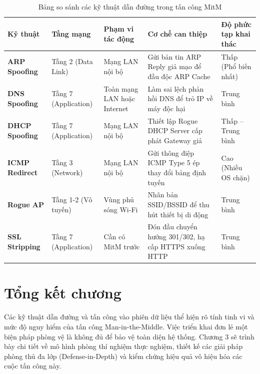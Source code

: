 \begin{table}[htbp]
  \centering
  \caption{Bảng so sánh các kỹ thuật dẫn đường trong tấn công MitM}
  \label{tab:redirection-comparison}
  \begin{tabularx}{\textwidth}{p{3.2cm} p{1.8cm} p{2.2cm} L p{2.5cm}}
    \toprule
    \textbf{Kỹ thuật} & \textbf{Tầng mạng} & \textbf{Phạm vi tác động} & \textbf{Cơ chế can thiệp} & \textbf{Độ phức tạp khai thác} \\
    \midrule
    \textbf{ARP Spoofing} & Tầng 2 (Data Link) & Mạng LAN nội bộ & Gửi bản tin ARP Reply giả mạo để đầu độc ARP Cache & Thấp (Phổ biến nhất) \\
    \textbf{DNS Spoofing} & Tầng 7 (Application) & Toàn mạng LAN hoặc Internet & Làm sai lệch phản hồi DNS để trỏ IP về máy độc hại & Trung bình \\
    \textbf{DHCP Spoofing} & Tầng 7 (Application) & Mạng LAN nội bộ & Thiết lập Rogue DHCP Server cấp phát Gateway giả & Thấp -- Trung bình \\
    \textbf{ICMP Redirect} & Tầng 3 (Network) & Mạng LAN nội bộ & Gửi thông điệp ICMP Type 5 ép thay đổi bảng định tuyến & Cao (Nhiều OS chặn) \\
    \textbf{Rogue AP} & Tầng 1-2 (Vô tuyến) & Vùng phủ sóng Wi-Fi & Nhân bản SSID/BSSID để thu hút thiết bị di động & Trung bình \\
    \textbf{SSL Stripping} & Tầng 7 (Application) & Cần có MitM trước & Đón đầu chuyển hướng 301/302, hạ cấp HTTPS xuống HTTP & Trung bình \\
    \bottomrule
  \end{tabularx}
\end{table}

\section{Tổng kết chương}

Các kỹ thuật dẫn đường và tấn công vào phiên dữ liệu thể hiện rõ tính tinh vi và mức độ nguy hiểm của tấn công Man-in-the-Middle. Việc triển khai đơn lẻ một biện pháp phòng vệ là không đủ để bảo vệ toàn diện hệ thống. Chương 3 sẽ trình bày chi tiết về mô hình phòng thí nghiệm thực nghiệm, thiết kế các giải pháp phòng thủ đa lớp (Defense-in-Depth) và kiểm chứng hiệu quả vô hiệu hóa các cuộc tấn công này.
